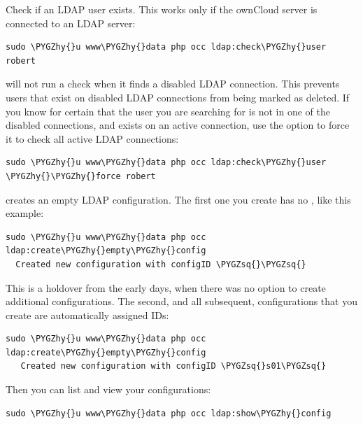 \documentclass[letterpaper,10pt,english]{sphinxmanual}
\def\PYGZhy{\char`\-}
\def\PYGZsq{\char`\'}
\begin{document}
Check if an LDAP user exists. This works only if the ownCloud server is
connected to an LDAP server:

\begin{Verbatim}[commandchars=\\\{\}]
sudo \PYGZhy{}u www\PYGZhy{}data php occ ldap:check\PYGZhy{}user robert
\end{Verbatim}

 will not run a check when it finds a disabled LDAP
connection. This prevents users that exist on disabled LDAP connections from
being marked as deleted. If you know for certain that the user you are searching for
is not in one of the disabled connections, and exists on an active connection,
use the  option to force it to check all active LDAP connections:

\begin{Verbatim}[commandchars=\\\{\}]
sudo \PYGZhy{}u www\PYGZhy{}data php occ ldap:check\PYGZhy{}user \PYGZhy{}\PYGZhy{}force robert
\end{Verbatim}

 creates an empty LDAP configuration. The first
one you create has no , like this example:

\begin{Verbatim}[commandchars=\\\{\}]
sudo \PYGZhy{}u www\PYGZhy{}data php occ ldap:create\PYGZhy{}empty\PYGZhy{}config
  Created new configuration with configID \PYGZsq{}\PYGZsq{}
\end{Verbatim}

This is a holdover from the early days, when there was no option to create
additional configurations. The second, and all subsequent, configurations
that you create are automatically assigned IDs:

\begin{Verbatim}[commandchars=\\\{\}]
sudo \PYGZhy{}u www\PYGZhy{}data php occ ldap:create\PYGZhy{}empty\PYGZhy{}config
   Created new configuration with configID \PYGZsq{}s01\PYGZsq{}
\end{Verbatim}

Then you can list and view your configurations:

\begin{Verbatim}[commandchars=\\\{\}]
sudo \PYGZhy{}u www\PYGZhy{}data php occ ldap:show\PYGZhy{}config
\end{Verbatim}
\end{document}
